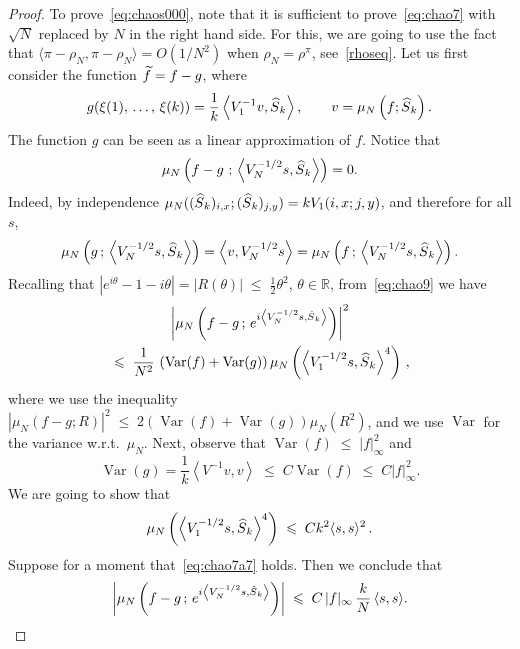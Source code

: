 \documentclass[AHL,Unicode,longabstracts,published]{cedram}
\renewcommand{\leq}{\;\leqslant\;}
\newcommand{\rhoN}{\rho^{\pi}}
\newcommand{\scalar}[2]{\langle #1, #2\rangle}
\DeclareMathOperator{\var}{Var}
\newcommand{\bbR}{\mathbb{R}}
\let\r=\rho
\let\oldtilde\tilde
\renewcommand*{\tilde}[1]{\mathchoice{\widetilde{#1}}{\widetilde{#1}}{\oldtilde{#1}}{\oldtilde{#1}}}
\let\oldhat\hat
\renewcommand*{\hat}[1]{\mathchoice{\widehat{#1}}{\widehat{#1}}{\oldhat{#1}}{\oldhat{#1}}}
\begin{document}
\begin{proof}
To prove~\eqref{eq:chaos000}, note that it is sufficient to prove~\eqref{eq:chao7} with $\sqrt N$ replaced by $N$ in the right hand side. For this, we are going to use the fact that $\scalar{\pi-\r_N}{\pi-\r_N}=O(1/N^2)$ when $\r_N=\rhoN$, see~\eqref{rhoseq}. Let us first consider the function $\tilde f = f-g$, where
\begin{align}\label{eq:chao8}
g(\xi(1),\,\dots,\,\xi(k))=\frac1k\left\langle V_1^{-1}v,\hat S_k\right\rangle,\qquad v = \mu_N\left(f;\hat S_k\right).
\end{align}
The function $g$ can be seen as a linear approximation of $f$. Notice that
\begin{align}\label{eq:chao9}
\mu_N\left(f-g\, \,;\,\left\langle V_N^{-1/2} s,\hat S_k\right\rangle\right)=0.
\end{align}
Indeed, by independence $\mu_N((\hat S_k)_{i,x};(\hat S_k)_{j,y}) = k V_1(i,x;j,y) $, and therefore for all $s$,
\begin{align}\label{eq:chao10}
\mu_N\left(g \,;\,\left\langle V_N^{-1/2} s,\hat S_k\right\rangle\right) = \left\langle v,V_N^{-1/2} s\right\rangle =\mu_N\left(f\,;\,\left\langle V_N^{-1/2} s,\hat S_k\right\rangle\right).
\end{align}
Recalling that $|e^{i\theta}-1-i\theta|=|R(\theta)|\leq \frac12\theta^2$, $\theta\in\bbR$, from~\eqref{eq:chao9} we have
\begin{multline}\label{eq:chao71x}
\left|\mu_N\left(f-g\,; \,e^{i\left\langle V_N^{-1/2} s,\hat S_k\right\rangle}
\right)\right|^2\\
\leq \frac1{N^2}\,\left(\var(f) + \var(g)\right)\mu_N\left(\left\langle V_1^{-1/2} s,\hat S_k\right\rangle^4\right)\,,
\end{multline}
where we use the inequality $|\mu_N(f-g;R)|^2\leq 2(\var(f) + \var(g))\mu_N(R^2)$, and we use $\var$ for the variance w.r.t.\ $\mu_N$. Next, observe that $\var(f)\leq |f|_\infty^2$ and
\[
\var(g) = \frac1k \left\langle V^{-1}v,v\right\rangle \leq C \var(f) \leq C |f|_\infty^2.
\]
We are going to show that
\begin{align}\label{eq:chao7a7}
\mu_N\left(\left\langle V_1^{-1/2} s,\hat S_k\right\rangle^4\right)
\leq C k^2\scalar{s}{s}^2\,.
\end{align}
Suppose for a moment that~\eqref{eq:chao7a7} holds. Then we conclude that
\begin{align}\label{eq:chao7a}
\left|\mu_N\left(f-g\,; \,e^{i\left\langle V_N^{-1/2} s,\hat S_k\right\rangle}\right)\right|\leq C \,|f|_\infty\,\frac{k}{ N}\,\scalar{s}{s}.
\end{align}

\end{proof}
\end{document}

